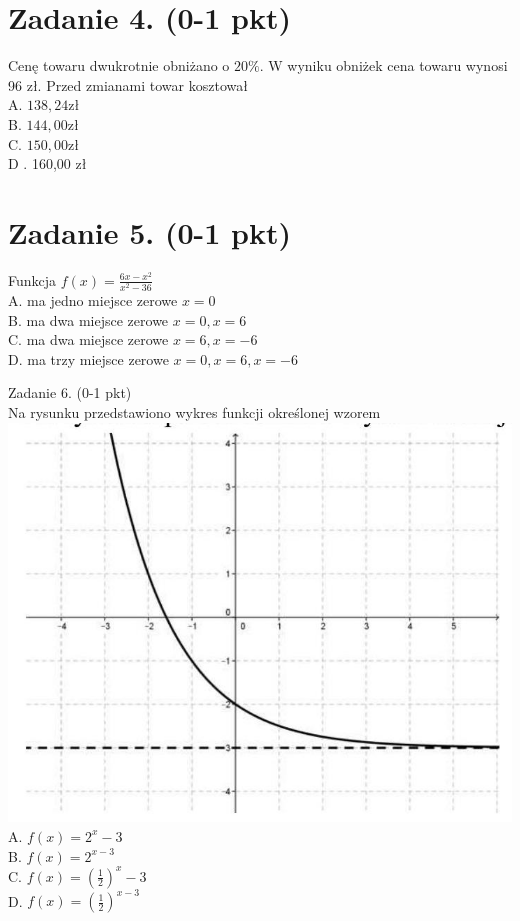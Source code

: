 \documentclass[10pt]{article}
\begin{document}
\section*{Zadanie 4. (0-1 pkt)}
Cenę towaru dwukrotnie obniżano o \(20 \%\). W wyniku obniżek cena towaru wynosi 96 zł. Przed zmianami towar kosztował\\
A. \(138,24 \mathrm{zł}\)\\
B. \(144,00 \mathrm{zł}\)\\
C. \(150,00 \mathrm{zł}\)\\
D . 160,00 zł

\section*{Zadanie 5. (0-1 pkt)}
Funkcja \(f(x)=\frac{6 x-x^{2}}{x^{2}-36}\)\\
A. ma jedno miejsce zerowe \(x=0\)\\
B. ma dwa miejsce zerowe \(x=0, x=6\)\\
C. ma dwa miejsce zerowe \(x=6, x=-6\)\\
D. ma trzy miejsce zerowe \(x=0, x=6, x=-6\)

Zadanie 6. (0-1 pkt)\\
Na rysunku przedstawiono wykres funkcji określonej wzorem\\
\includegraphics[max width=\textwidth, center]{2024_11_21_832f1bc2b626663f1df2g-02}\\
A. \(f(x)=2^{x}-3\)\\
B. \(f(x)=2^{x-3}\)\\
C. \(f(x)=\left(\frac{1}{2}\right)^{x}-3\)\\
D. \(f(x)=\left(\frac{1}{2}\right)^{x-3}\)
\end{document}
